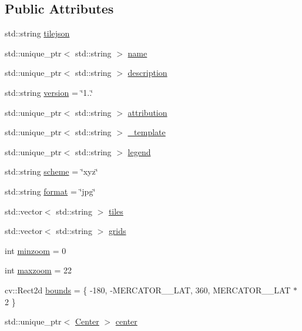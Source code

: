 \subsection*{Public Attributes}
\begin{DoxyCompactItemize}
\item 
std\+::string \hyperlink{structdg_1_1deepcore_1_1imagery_1_1_tile_json_a6eaf5b206fdf010f6c4b089d9f1dbe32}{tilejson}
\item 
std\+::unique\+\_\+ptr$<$ std\+::string $>$ \hyperlink{structdg_1_1deepcore_1_1imagery_1_1_tile_json_a5e1cb3591fa0d3c15184869d90bf42f9}{name}
\item 
std\+::unique\+\_\+ptr$<$ std\+::string $>$ \hyperlink{structdg_1_1deepcore_1_1imagery_1_1_tile_json_ac2dd8a58ac978ddb8c01fbd5c7fa4820}{description}
\item 
std\+::string \hyperlink{structdg_1_1deepcore_1_1imagery_1_1_tile_json_a3037558f224105b744a9a2c43fdb7b5e}{version} = \char`\"{}1..\char`\"{}
\item 
std\+::unique\+\_\+ptr$<$ std\+::string $>$ \hyperlink{structdg_1_1deepcore_1_1imagery_1_1_tile_json_aaa14afeb610f9e02b8ffb7e6641160d6}{attribution}
\item 
std\+::unique\+\_\+ptr$<$ std\+::string $>$ \hyperlink{structdg_1_1deepcore_1_1imagery_1_1_tile_json_aed003e5b44a92c2dcaf84a71fa19acd0}{\+\_\+template}
\item 
std\+::unique\+\_\+ptr$<$ std\+::string $>$ \hyperlink{structdg_1_1deepcore_1_1imagery_1_1_tile_json_a6c3f9e95dcca896f30244d71b4a93be1}{legend}
\item 
std\+::string \hyperlink{structdg_1_1deepcore_1_1imagery_1_1_tile_json_aa81ddd251615c83ed800924570aa6530}{scheme} = \char`\"{}xyz\char`\"{}
\item 
std\+::string \hyperlink{structdg_1_1deepcore_1_1imagery_1_1_tile_json_a0ac858ae62a9b9243e8bd8c31a86af7b}{format} = \char`\"{}jpg\char`\"{}
\item 
std\+::vector$<$ std\+::string $>$ \hyperlink{structdg_1_1deepcore_1_1imagery_1_1_tile_json_a586d9458169760019abd61b1651c5112}{tiles}
\item 
std\+::vector$<$ std\+::string $>$ \hyperlink{structdg_1_1deepcore_1_1imagery_1_1_tile_json_a0155f9490e2a1db7894307c860bb5f93}{grids}
\item 
int \hyperlink{structdg_1_1deepcore_1_1imagery_1_1_tile_json_a77756c09c221095697741311a6a6ee50}{minzoom} = 0
\item 
int \hyperlink{structdg_1_1deepcore_1_1imagery_1_1_tile_json_a8f32c4c1ca4750f301ed39ce8d3c19f5}{maxzoom} = 22
\item 
cv\+::\+Rect2d \hyperlink{structdg_1_1deepcore_1_1imagery_1_1_tile_json_a7c0423d8989a5e6b0f5600ac5223b823}{bounds} = \{ -\/180, -\/M\+E\+R\+C\+A\+T\+O\+R\+\_\+\_\+\+L\+AT, 360, M\+E\+R\+C\+A\+T\+O\+R\+\_\+\_\+\+L\+AT $\ast$ 2 \}
\item 
std\+::unique\+\_\+ptr$<$ \hyperlink{structdg_1_1deepcore_1_1imagery_1_1_tile_json_1_1_center}{Center} $>$ \hyperlink{structdg_1_1deepcore_1_1imagery_1_1_tile_json_a774610a2770889bf336b90335a93f4c1}{center}
\end{DoxyCompactItemize}


